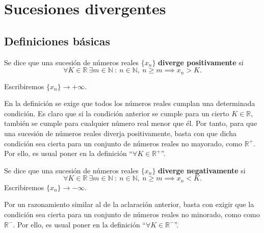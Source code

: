 \chapter{Sucesiones divergentes}\label{chp:Tema7}


\section{Definiciones básicas}
\begin{definicion}
    Se dice que una sucesión de números reales $\{x_n\}$ \textbf{diverge positivamente} si
    \begin{equation*}
        \forall K \in \mathbb{R} ~ \exists m \in \mathbb{N} ~:~ n \in \mathbb{N}, ~ n \geq m \implies x_n > K.
    \end{equation*}
    
    Escribiremos $\{x_n\} \longrightarrow + \infty$.
\end{definicion}

En la definición se exige que todos los números reales cumplan una determinada condición. Es claro que si la condición anterior se cumple para un cierto $K \in \mathbb{R}$, también se cumple para cualquier número real menor que él. Por tanto, para que una sucesión de números reales diverja positivamente, basta con que dicha condición sea cierta para un conjunto de números reales no mayorado, como $\mathbb{R}^+$. Por ello, es usual poner en la definición ``$\forall K \in \mathbb{R}^+$''.

\begin{definicion}
    Se dice que una sucesión de números reales $\{x_n\}$ \textbf{diverge negativamente} si
    \begin{equation*}
        \forall K \in \mathbb{R} ~ \exists m \in \mathbb{N} ~:~ n \in \mathbb{N}, ~ n \geq m \implies x_n < K.
    \end{equation*}
    Escribiremos $\{x_n\} \longrightarrow - \infty$.
\end{definicion}

Por un razonamiento similar al de la aclaración anterior, basta con exigir que la condición sea cierta para un conjunto de números reales no minorado, como como $\mathbb{R}^-$. Por ello, es usual poner en la definición ``$\forall K \in \mathbb{R}^-$''.

